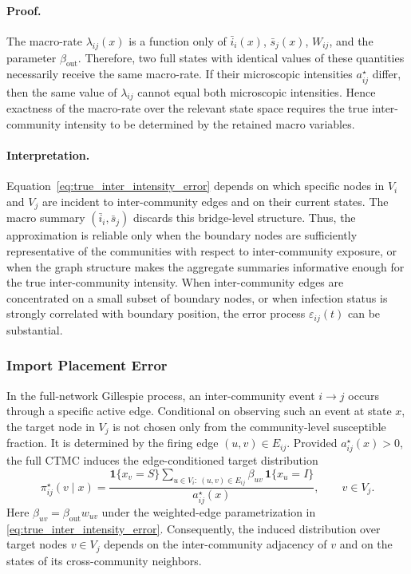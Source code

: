 \documentclass[a4paper,fleqn]{cas-sc}
\newcommand{\ReadStatusTwo}[5]{}
\begin{document}
\paragraph{Proof.}
The macro-rate \(\lambda_{ij}(x)\) is a function only of \(\bar{i}_i(x)\), \(\bar{s}_j(x)\), \(W_{ij}\), and the parameter \(\beta_{\mathrm{out}}\). Therefore, two full states with identical values of these quantities necessarily receive the same macro-rate. If their microscopic intensities \(a^\star_{ij}\) differ, then the same value of \(\lambda_{ij}\) cannot equal both microscopic intensities. Hence exactness of the macro-rate over the relevant state space requires the true inter-community intensity to be determined by the retained macro variables.

\paragraph{Interpretation.}
Equation~\eqref{eq:true_inter_intensity_error} depends on which specific nodes in \(V_i\) and \(V_j\) are incident to inter-community edges and on their current states. The macro summary \((\bar{i}_i,\bar{s}_j)\) discards this bridge-level structure. Thus, the approximation is reliable only when the boundary nodes are sufficiently representative of the communities with respect to inter-community exposure, or when the graph structure makes the aggregate summaries informative enough for the true inter-community intensity. When inter-community edges are concentrated on a small subset of boundary nodes, or when infection status is strongly correlated with boundary position, the error process \(\varepsilon_{ij}(t)\) can be substantial.

\subsubsection{Import Placement Error}
\ReadStatusTwo{Import Placement Error}{Yulian}{1}{Michael}{0}

In the full-network Gillespie process, an inter-community event \(i\to j\) occurs through a specific active edge. Conditional on observing such an event at state \(x\), the target node in \(V_j\) is not chosen only from the community-level susceptible fraction. It is determined by the firing edge \((u,v)\in E_{ij}\). Provided \(a^\star_{ij}(x)>0\), the full CTMC induces the edge-conditioned target distribution
\begin{equation}
\label{eq:exact_import_placement}
\pi^\star_{ij}(v\mid x)
=
\frac{
\mathbf{1}\{x_v=S\}
\sum_{u\in V_i:\ (u,v)\in E_{ij}}
\beta_{uv}\,\mathbf{1}\{x_u=I\}
}
{a^\star_{ij}(x)},
\qquad v\in V_j.
\end{equation}
Here \(\beta_{uv}=\beta_{\mathrm{out}}w_{uv}\) under the weighted-edge parametrization in \eqref{eq:true_inter_intensity_error}.
Consequently, the induced distribution over target nodes \(v\in V_j\) depends on the inter-community adjacency of \(v\) and on the states of its cross-community neighbors.
\end{document}
